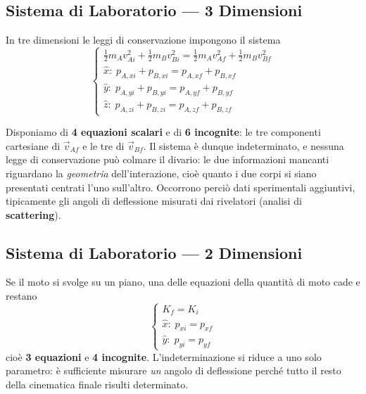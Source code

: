 \subsection{Sistema di Laboratorio --- 3 Dimensioni}

In tre dimensioni le leggi di conservazione impongono il sistema
\begin{equation}
\begin{cases}
    \tfrac{1}{2} m_A v_{Ai}^2 + \tfrac{1}{2} m_B v_{Bi}^2
        = \tfrac{1}{2} m_A v_{Af}^2 + \tfrac{1}{2} m_B v_{Bf}^2 \\[4pt]
    \hat{x}: \; p_{A,xi} + p_{B,xi} = p_{A,xf} + p_{B,xf} \\[2pt]
    \hat{y}: \; p_{A,yi} + p_{B,yi} = p_{A,yf} + p_{B,yf} \\[2pt]
    \hat{z}: \; p_{A,zi} + p_{B,zi} = p_{A,zf} + p_{B,zf}
\end{cases}
\end{equation}

Disponiamo di \textbf{4 equazioni scalari} e di \textbf{6 incognite}: le tre componenti cartesiane di $\vec{v}_{Af}$ e le tre di $\vec{v}_{Bf}$. Il sistema è dunque indeterminato, e nessuna legge di conservazione può colmare il divario: le due informazioni mancanti riguardano la \emph{geometria} dell'interazione, cioè quanto i due corpi si siano presentati centrati l'uno sull'altro. Occorrono perciò dati sperimentali aggiuntivi, tipicamente gli angoli di deflessione misurati dai rivelatori (analisi di \textbf{scattering}).

\subsection{Sistema di Laboratorio --- 2 Dimensioni}

Se il moto si svolge su un piano, una delle equazioni della quantità di moto cade e restano
\begin{equation}
\begin{cases}
    K_f = K_i \\[3pt]
    \hat{x}: \; p_{xi} = p_{xf} \\[2pt]
    \hat{y}: \; p_{yi} = p_{yf}
\end{cases}
\end{equation}
cioè \textbf{3 equazioni} e \textbf{4 incognite}. L'indeterminazione si riduce a uno solo parametro: è sufficiente misurare \emph{un} angolo di deflessione perché tutto il resto della cinematica finale risulti determinato.

